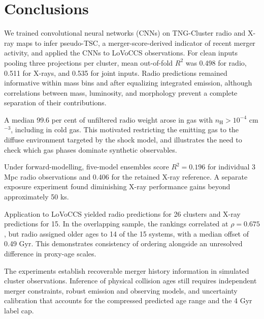 \section{Conclusions}
\label{sec:conclusions}

We trained convolutional neural networks (CNNs) on TNG-Cluster radio and X-ray maps to infer pseudo-TSC, a merger-score-derived indicator of recent merger activity, and applied the CNNs to LoVoCCS observations.
For clean inputs pooling three projections per cluster, mean out-of-fold $R^2$ was 0.498 for radio, 0.511 for X-rays, and 0.535 for joint inputs.
Radio predictions remained informative within mass bins and after equalizing integrated emission, although correlations between mass, luminosity, and morphology prevent a complete separation of their contributions.

A median 99.6 per cent of unfiltered radio weight arose in gas with $n_\text{H}>10^{-4}$ cm$^{-3}$, including in cold gas.
This motivated restricting the emitting gas to the diffuse environment targeted by the shock model, and illustrates the need to check which gas phases dominate synthetic observables.

Under forward-modelling, five-model ensembles score $R^2=0.196$ for individual 3 Mpc radio observations and 0.406 for the retained X-ray reference.
A separate exposure experiment found diminishing X-ray performance gains beyond approximately 50 ks.

Application to LoVoCCS yielded radio predictions for 26 clusters and X-ray predictions for 15.
In the overlapping sample, the rankings correlated at $\rho=0.675$, but radio assigned older ages to 14 of the 15 systems, with a median offset of 0.49 Gyr.
This demonstrates consistency of ordering alongside an unresolved difference in proxy-age scales.

The experiments establish recoverable merger history information in simulated cluster observations.
Inference of physical collision ages still requires independent merger constraints, robust emission and observing models, and uncertainty calibration that accounts for the compressed predicted age range and the 4 Gyr label cap.
